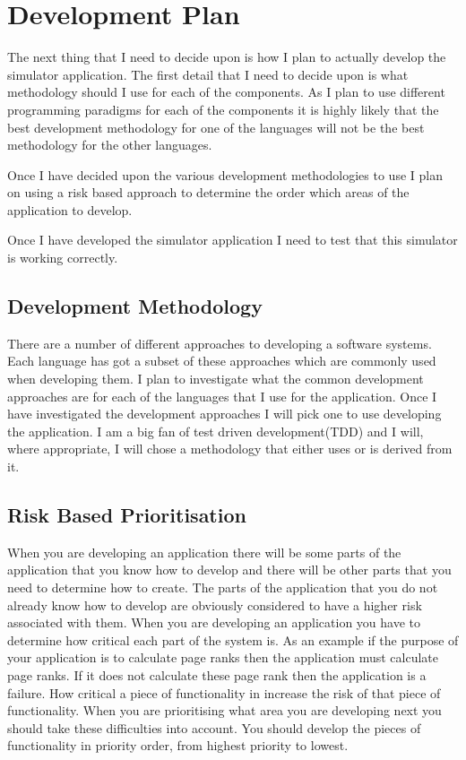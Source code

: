 \documentclass[11pt]{article} %
\begin{document}
\section{Development Plan}
The next thing that I need to decide upon is how I plan to actually develop the simulator application. The first detail that I need to decide upon is what methodology should I use for each of the components. As I plan to use different programming paradigms for each of the components it is highly likely that the best development methodology for one of the languages will not be the best methodology for the other languages.

Once I have decided upon the various development methodologies to use I plan on using a risk based approach to determine the order which areas of the application to develop.

Once I have developed the simulator application I need to test that this simulator is working correctly.
\subsection{Development Methodology}
There are a number of different approaches to developing a software systems. Each language has got a subset of these approaches which are commonly used when developing them. I plan to investigate what the common development approaches are for each of the languages that I use for the application. Once I have investigated the development approaches I will pick one to use developing the application. I am a big fan of test driven development(TDD) and I will, where appropriate, I will chose a methodology that either uses or is derived from it.
\subsection{Risk Based Prioritisation}
When you are developing an application there will be some parts of the application that you know how to develop and there will be other parts that you need to determine how to create. The parts of the application that you do not already know how to develop are obviously considered to have a higher risk associated with them. When you are developing an application you have to determine how critical each part of the system is. As an example if the purpose of your application is to calculate page ranks then the application must calculate page ranks. If it does not calculate these page rank then the application is a failure. How critical a piece of functionality in increase the risk of that piece of functionality. When you are prioritising what area you are developing next you should take these difficulties into account. You should develop the pieces of functionality in priority order, from highest priority to lowest.
\end{document}
